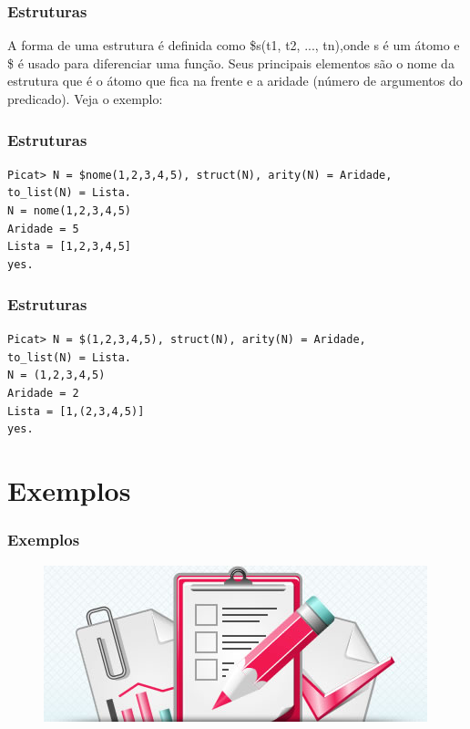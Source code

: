 \documentclass{beamer}
\begin{document}

\begin{frame}
    \frametitle{Estruturas}
    A forma de uma estrutura é definida como \$s(t1, t2, ..., tn),onde s é um átomo e \$ é usado para diferenciar uma função. 
    Seus principais elementos são o nome da estrutura que é o átomo que fica na frente e a aridade (número de argumentos do predicado). 
    Veja o exemplo:
\end{frame}


\begin{frame}
    \frametitle{Estruturas}
    \texttt{Picat> N = \$nome(1,2,3,4,5), struct(N), arity(N) = Aridade,}\\
    \texttt{to\_list(N) = Lista.}\\

    \texttt{N = nome(1,2,3,4,5)}\\
    \texttt{Aridade = 5}\\
    \texttt{Lista = [1,2,3,4,5]}\\
    \texttt{yes.}
\end{frame}


\begin{frame}
    \frametitle{Estruturas}
    \texttt{Picat> N = \$(1,2,3,4,5), struct(N), arity(N) = Aridade,}\\
    \texttt{to\_list(N) = Lista.}\\

    \texttt{N = (1,2,3,4,5)}\\
    \texttt{Aridade = 2}\\
    \texttt{Lista = [1,(2,3,4,5)]}\\
    \texttt{yes.}
\end{frame}


\section{Exemplos}
\begin{frame}
    \frametitle{Exemplos}
    \begin{figure}[!ht]
    \centering
    \includegraphics[width=.6\textwidth]{exercicio.jpg}
    \end{figure}
\end{frame}
\end{document}
